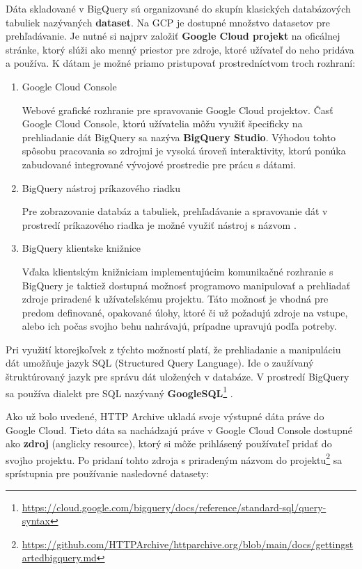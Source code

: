 Dáta skladované v BigQuery sú organizované do skupín klasických databázových tabuliek nazývaných \textbf{dataset}.
Na GCP je dostupné množstvo datasetov pre prehľadávanie.
Je nutné si najprv založiť \textbf{Google Cloud projekt} na oficálnej stránke, ktorý slúži ako menný priestor pre zdroje, ktoré užívateľ do neho pridáva a používa.
K dátam je možné priamo pristupovať prostredníctvom troch rozhraní: \cite{google-cloud} 
\begin{enumerate}
    \item Google Cloud Console

    Webové grafické rozhranie pre spravovanie Google Cloud projektov. 
    Časť Google Cloud Console, ktorú užívatelia môžu využiť špecificky na prehliadanie dát BigQuery sa nazýva \textbf{BigQuery Studio}.
    Výhodou tohto spôsobu pracovania so zdrojmi je vysoká úroveň interaktivity, ktorú ponúka zabudované integrované vývojové prostredie pre prácu s dátami. 
    
    \item BigQuery nástroj príkazového riadku

    Pre zobrazovanie databáz a tabuliek, prehľadávanie a spravovanie dát v prostredí príkazového riadka je možné využiť nástroj s názvom \textbf{}. 
    
    \item BigQuery klientske knižnice

    Vďaka klientským knižniciam implementujúcim komunikačné rozhranie s BigQuery je taktiež dostupná možnosť programovo manipulovať a prehliadať zdroje priradené k užívateľskému projektu.
    Táto možnosť je vhodná pre predom definované, opakované úlohy, ktoré či už požadujú zdroje na vstupe, alebo ich počas svojho behu nahrávajú, prípadne upravujú podľa potreby.
\end{enumerate}

Pri využití ktorejkoľvek z týchto možností platí, že prehliadanie a manipuláciu dát umožňuje jazyk SQL (Structured Query Language).
Ide o zaužívaný štruktúrovaný jazyk pre správu dát uložených v databáze.
V prostredí BigQuery sa používa dialekt pre SQL nazývaný \textbf{GoogleSQL}\footnote{\href{https://cloud.google.com/bigquery/docs/reference/standard-sql/query-syntax}{https://cloud.google.com/bigquery/docs/reference/standard-sql/query-syntax}} \cite{google-bq}.

Ako už bolo uvedené, HTTP Archive ukladá svoje výstupné dáta práve do Google Cloud.
Tieto dáta sa nachádzajú práve v Google Cloud Console dostupné ako \textbf{zdroj} (anglicky resource), ktorý si môže prihlásený používateľ pridať do svojho projektu.
Po pridaní tohto zdroja s priradeným názvom  do projektu\footnote{\href{https://github.com/HTTPArchive/httparchive.org/blob/main/docs/gettingstarted\_bigquery.md}{https://github.com/HTTPArchive/httparchive.org/blob/main/docs/gettingstarted\textunderscore bigquery.md}} sa sprístupnia pre používanie nasledovné datasety: \cite{httparchive-repo}

